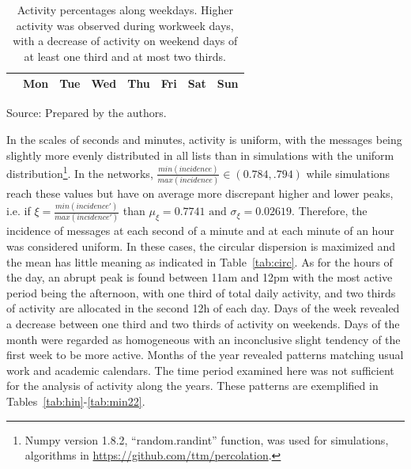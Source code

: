 						\begin{table}
						\caption{Activity percentages along weekdays.
						Higher activity was observed during workweek days, with a decrease of activity on weekend days of at least one third and at most two thirds.}
						\begin{center}
						\begin{tabular}{ | l ||  c | c | c | c | c |   c | c |}
						\hline
						& Mon & Tue & Wed & Thu & Fri & Sat & Sun  \\ \hline
						
						\end{tabular}
						\end{center}
						\label{tab:win}
						\begin{flushleft}
								Source: Prepared by the authors.\
								\end{flushleft}
								\end{table}

								In the scales of seconds and minutes, activity is uniform,
								with the messages being slightly more evenly distributed in all lists than in simulations with the uniform distribution\footnote{Numpy version 1.8.2, ``random.randint'' function, was used for simulations, algorithms in \url{https://github.com/ttm/percolation}.}.
								In the networks, $\frac{min(incidence)}{max(incidence)} \in (0.784,.794)$ while simulations reach these values but have on average more discrepant higher and lower peaks, i.e. if $\xi=\frac{min(incidence')}{max(incidence')}$ than $\mu_\xi=0.7741 \text{ and } \sigma_\xi=0.02619$.
								Therefore, the incidence of messages at each second of a minute and at each minute of an hour was considered uniform.
								In these cases, the circular dispersion is maximized and the mean has little meaning as indicated in Table~\ref{tab:circ}.
								As for the hours of the day, an abrupt peak is found between 11am and 12pm with the most active period being the afternoon, with one third of total daily activity, and two thirds of activity are allocated in the second 12h of each day. Days of the week revealed a decrease between one third and two thirds of activity on weekends.
								Days of the month were regarded as homogeneous with an inconclusive slight tendency of the first week to be more active.
								Months of the year revealed patterns matching usual work and academic calendars. The time period examined here was not sufficient for the analysis of activity along the years. These patterns are exemplified in Tables~\ref{tab:hin}-\ref{tab:min22}.


